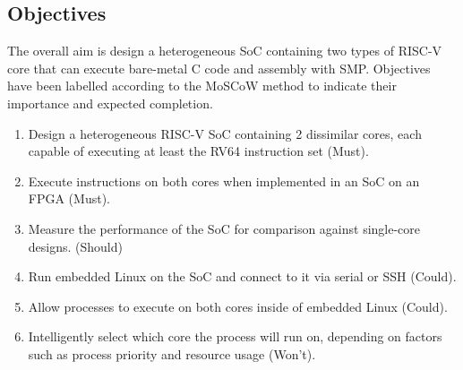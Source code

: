 \subsection{Objectives}
The overall aim is design a heterogeneous SoC containing two types of RISC-V core that can execute bare-metal C code and assembly with SMP. Objectives have been labelled according to the MoSCoW method\cite{} to indicate their importance and expected completion.
\begin{enumerate}
    \item Design a heterogeneous RISC-V SoC containing 2 dissimilar cores, each capable of executing at least the RV64 instruction set (Must).
    \item Execute instructions on both cores when implemented in an SoC on an FPGA (Must).
    \item Measure the performance of the SoC for comparison against single-core designs. (Should)
    \item Run embedded Linux on the SoC and connect to it via serial or SSH (Could).
    \item Allow processes to execute on both cores inside of embedded Linux (Could).
    \item Intelligently select which core the process will run on, depending on factors such as process priority and resource usage (Won't).
\end{enumerate}